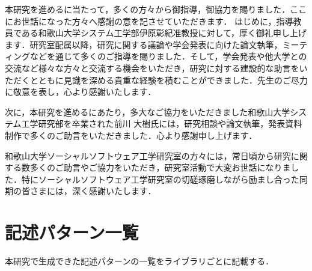 \documentclass[11pt]{jreport}
\begin{document}
\begin{acknowledgements}
本研究を進めるに当たって，多くの方々から御指導，御協力を賜りました．ここにお世話になった方々へ感謝の意を記させていただきます．
はじめに，指導教員である和歌山大学システム工学部伊原彰紀准教授に対して，厚く御礼申し上げます．研究室配属以降，研究に関する議論や学会発表に向けた論文執筆，ミーティングなどを通じて多くのご指導を賜りました．そして，学会発表や他大学との交流など様々な方々と交流する機会をいただき，研究に対する建設的な助言をいただくとともに見識を深める貴重な経験を積むことができました．先生のご尽力に敬意を表し，心より感謝いたします．

次に，本研究を進めるにあたり，多大なご協力をいただきました和歌山大学システム工学研究部を卒業された前川 大樹氏には，研究相談や論文執筆，発表資料制作で多くのご助言をいただきました．心より感謝申し上げます．

和歌山大学ソーシャルソフトウェア工学研究室の方々には，常日頃から研究に関する数多くのご助言やご協力をいただき，研究室活動で大変お世話になりました．特にソーシャルソフトウェア工学研究室の切磋琢磨しながら励まし合った同期の皆さまには，深く感謝いたします．





\end{acknowledgements}








%
\appendix

\chapter{記述パターン一覧}

本研究で生成できた記述パターンの一覧をライブラリごとに記載する．
\end{document}
